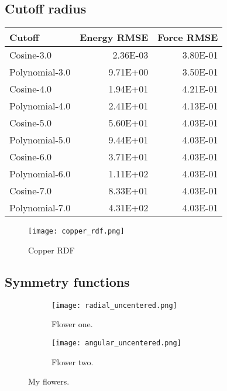 \subsection{Cutoff radius}

\begin{tabular}{lrr}
\toprule
         Cutoff &  Energy RMSE &  Force RMSE \\
\midrule
     Cosine-3.0 &     2.36E-03 &    3.80E-01 \\
 Polynomial-3.0 &     9.71E+00 &    3.50E-01 \\
     Cosine-4.0 &     1.94E+01 &    4.21E-01 \\
 Polynomial-4.0 &     2.41E+01 &    4.13E-01 \\
     Cosine-5.0 &     5.60E+01 &    4.03E-01 \\
 Polynomial-5.0 &     9.44E+01 &    4.03E-01 \\
     Cosine-6.0 &     3.71E+01 &    4.03E-01 \\
 Polynomial-6.0 &     1.11E+02 &    4.03E-01 \\
     Cosine-7.0 &     8.33E+01 &    4.03E-01 \\
 Polynomial-7.0 &     4.31E+02 &    4.03E-01 \\
\bottomrule
\end{tabular}

\begin{figure}
    \centering
    \texttt{[image: copper\_rdf.png]}
    \caption{Copper RDF}
    \label{fig:copper_rdf}
\end{figure}

\subsection{Symmetry functions}

\begin{figure}[!tbp]
\begin{adjustbox}{max width=1.2\linewidth,center}
\centering
  \begin{subfigure}[b]{0.55\textwidth}
      \texttt{[image: radial\_uncentered.png]}
    \caption{Flower one.}
    \label{fig:f1}
  \end{subfigure}
  \hfill
  \begin{subfigure}[b]{0.55\textwidth}
      \texttt{[image: angular\_uncentered.png]}
    \caption{Flower two.}
    \label{fig:f2}
  \end{subfigure}
\end{adjustbox}
\caption{My flowers.}
\end{figure}

